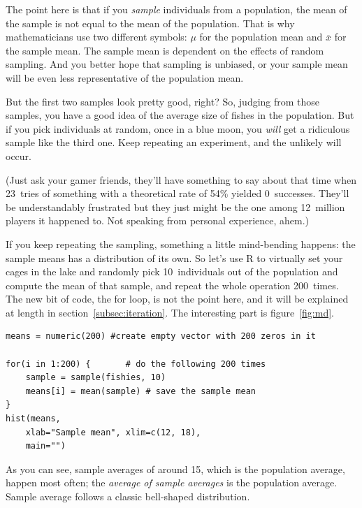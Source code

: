 \documentclass{report}
\newcommand{\code}[1]{\textsf{\ttfamily #1}}
\begin{document}
			The point here is that if you \emph{sample} individuals from a population, the mean of the sample is not equal to the mean of the population. That is why mathematicians use two different symbols: $\mu$ for the population mean and $\overline{x}$ for the sample mean. The sample mean is dependent on the effects of random sampling. And you better hope that sampling is unbiased, or your sample mean will be even less representative of the population mean.
			
			But the first two samples look pretty good, right? So, judging from those samples, you have a good idea of the average size of fishes in the population. But if you pick individuals at random, once in a blue moon, you \emph{will} get a ridiculous sample like the third one. Keep repeating an experiment, and the unlikely will occur.
			
			(Just ask your gamer friends, they'll have something to say about that time when 23~tries of something with a theoretical rate of 54\% yielded 0~successes. They'll be understandably frustrated but they just might be the one among 12~million players it happened to. Not speaking from personal experience, ahem.)
			
			If you keep repeating the sampling, something a little mind-bending happens: the sample means has a distribution of its own. So let's use R to virtually set your cages in the lake and randomly pick 10~individuals out of the population and compute the mean of that sample, and repeat the whole operation 200~times. The new bit of code, the \code{for} loop, is not the point here, and it will be explained at length in section~\ref{subsec:iteration}. The interesting part is figure~\ref{fig:md}.
			
			\begin{verbatim}
means = numeric(200) #create empty vector with 200 zeros in it

for(i in 1:200) {		# do the following 200 times
	sample = sample(fishies, 10)
	means[i] = mean(sample)	# save the sample mean
}
hist(means,
	xlab="Sample mean", xlim=c(12, 18),
	main="")
			\end{verbatim}
			
			As you can see, sample averages of around 15, which is the population average, happen most often; the \emph{average of sample averages} is the population average. Sample average follows a classic bell-shaped distribution.
\end{document}
